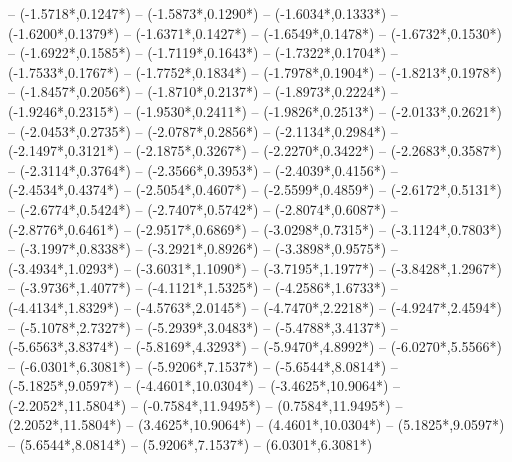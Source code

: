 {	-- ({-1.5718*\dx},{0.1247*\dy})
	-- ({-1.5873*\dx},{0.1290*\dy})
	-- ({-1.6034*\dx},{0.1333*\dy})
	-- ({-1.6200*\dx},{0.1379*\dy})
	-- ({-1.6371*\dx},{0.1427*\dy})
	-- ({-1.6549*\dx},{0.1478*\dy})
	-- ({-1.6732*\dx},{0.1530*\dy})
	-- ({-1.6922*\dx},{0.1585*\dy})
	-- ({-1.7119*\dx},{0.1643*\dy})
	-- ({-1.7322*\dx},{0.1704*\dy})
	-- ({-1.7533*\dx},{0.1767*\dy})
	-- ({-1.7752*\dx},{0.1834*\dy})
	-- ({-1.7978*\dx},{0.1904*\dy})
	-- ({-1.8213*\dx},{0.1978*\dy})
	-- ({-1.8457*\dx},{0.2056*\dy})
	-- ({-1.8710*\dx},{0.2137*\dy})
	-- ({-1.8973*\dx},{0.2224*\dy})
	-- ({-1.9246*\dx},{0.2315*\dy})
	-- ({-1.9530*\dx},{0.2411*\dy})
	-- ({-1.9826*\dx},{0.2513*\dy})
	-- ({-2.0133*\dx},{0.2621*\dy})
	-- ({-2.0453*\dx},{0.2735*\dy})
	-- ({-2.0787*\dx},{0.2856*\dy})
	-- ({-2.1134*\dx},{0.2984*\dy})
	-- ({-2.1497*\dx},{0.3121*\dy})
	-- ({-2.1875*\dx},{0.3267*\dy})
	-- ({-2.2270*\dx},{0.3422*\dy})
	-- ({-2.2683*\dx},{0.3587*\dy})
	-- ({-2.3114*\dx},{0.3764*\dy})
	-- ({-2.3566*\dx},{0.3953*\dy})
	-- ({-2.4039*\dx},{0.4156*\dy})
	-- ({-2.4534*\dx},{0.4374*\dy})
	-- ({-2.5054*\dx},{0.4607*\dy})
	-- ({-2.5599*\dx},{0.4859*\dy})
	-- ({-2.6172*\dx},{0.5131*\dy})
	-- ({-2.6774*\dx},{0.5424*\dy})
	-- ({-2.7407*\dx},{0.5742*\dy})
	-- ({-2.8074*\dx},{0.6087*\dy})
	-- ({-2.8776*\dx},{0.6461*\dy})
	-- ({-2.9517*\dx},{0.6869*\dy})
	-- ({-3.0298*\dx},{0.7315*\dy})
	-- ({-3.1124*\dx},{0.7803*\dy})
	-- ({-3.1997*\dx},{0.8338*\dy})
	-- ({-3.2921*\dx},{0.8926*\dy})
	-- ({-3.3898*\dx},{0.9575*\dy})
	-- ({-3.4934*\dx},{1.0293*\dy})
	-- ({-3.6031*\dx},{1.1090*\dy})
	-- ({-3.7195*\dx},{1.1977*\dy})
	-- ({-3.8428*\dx},{1.2967*\dy})
	-- ({-3.9736*\dx},{1.4077*\dy})
	-- ({-4.1121*\dx},{1.5325*\dy})
	-- ({-4.2586*\dx},{1.6733*\dy})
	-- ({-4.4134*\dx},{1.8329*\dy})
	-- ({-4.5763*\dx},{2.0145*\dy})
	-- ({-4.7470*\dx},{2.2218*\dy})
	-- ({-4.9247*\dx},{2.4594*\dy})
	-- ({-5.1078*\dx},{2.7327*\dy})
	-- ({-5.2939*\dx},{3.0483*\dy})
	-- ({-5.4788*\dx},{3.4137*\dy})
	-- ({-5.6563*\dx},{3.8374*\dy})
	-- ({-5.8169*\dx},{4.3293*\dy})
	-- ({-5.9470*\dx},{4.8992*\dy})
	-- ({-6.0270*\dx},{5.5566*\dy})
	-- ({-6.0301*\dx},{6.3081*\dy})
	-- ({-5.9206*\dx},{7.1537*\dy})
	-- ({-5.6544*\dx},{8.0814*\dy})
	-- ({-5.1825*\dx},{9.0597*\dy})
	-- ({-4.4601*\dx},{10.0304*\dy})
	-- ({-3.4625*\dx},{10.9064*\dy})
	-- ({-2.2052*\dx},{11.5804*\dy})
	-- ({-0.7584*\dx},{11.9495*\dy})
	-- ({0.7584*\dx},{11.9495*\dy})
	-- ({2.2052*\dx},{11.5804*\dy})
	-- ({3.4625*\dx},{10.9064*\dy})
	-- ({4.4601*\dx},{10.0304*\dy})
	-- ({5.1825*\dx},{9.0597*\dy})
	-- ({5.6544*\dx},{8.0814*\dy})
	-- ({5.9206*\dx},{7.1537*\dy})
	-- ({6.0301*\dx},{6.3081*\dy})
}

